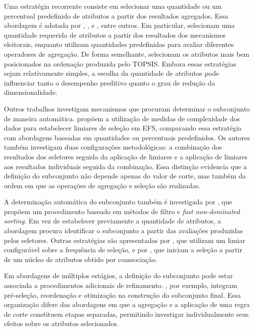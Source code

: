 Uma estratégia recorrente consiste em selecionar uma quantidade ou um percentual predefinido de atributos a partir dos resultados agregados. Essa abordagem é adotada por , ,  e , entre outros. Em particular,  selecionam uma quantidade requerida de atributos a partir dos resultados dos mecanismos eleitorais, enquanto  utilizam quantidades predefinidas para avaliar diferentes operadores de agregação. De forma semelhante,  selecionam os atributos mais bem posicionados na ordenação produzida pelo TOPSIS. Embora essas estratégias sejam relativamente simples, a escolha da quantidade de atributos pode influenciar tanto o desempenho preditivo quanto o grau de redução da dimensionalidade.

Outros trabalhos investigam mecanismos que procuram determinar o subconjunto de maneira automática.  propõem a utilização de medidas de complexidade dos dados para estabelecer limiares de seleção em EFS, comparando essa estratégia com abordagens baseadas em quantidades ou percentuais predefinidos. Os autores também investigam duas configurações metodológicas: a combinação dos resultados dos seletores seguida da aplicação de limiares e a aplicação de limiares aos resultados individuais seguida da combinação. Essa distinção evidencia que a definição do subconjunto não depende apenas do valor de corte, mas também da ordem em que as operações de agregação e seleção são realizadas.

A determinação automática do subconjunto também é investigada por , que propõem um procedimento baseado em métodos de filtro e \textit{fast non-dominated sorting}. Em vez de estabelecer previamente a quantidade de atributos, a abordagem procura identificar o subconjunto a partir das avaliações produzidas pelos seletores. Outras estratégias são apresentadas por , que utilizam um limiar configurável sobre a frequência de seleção, e por , que iniciam a seleção a partir de um núcleo de atributos obtido por coassociação.

Em abordagens de múltiplos estágios, a definição do subconjunto pode estar associada a procedimentos adicionais de refinamento. , por exemplo, integram pré-seleção, reordenação e otimização na construção do subconjunto final. Essa organização difere das abordagens em que a agregação e a aplicação de uma regra de corte constituem etapas separadas, permitindo investigar individualmente seus efeitos sobre os atributos selecionados.

